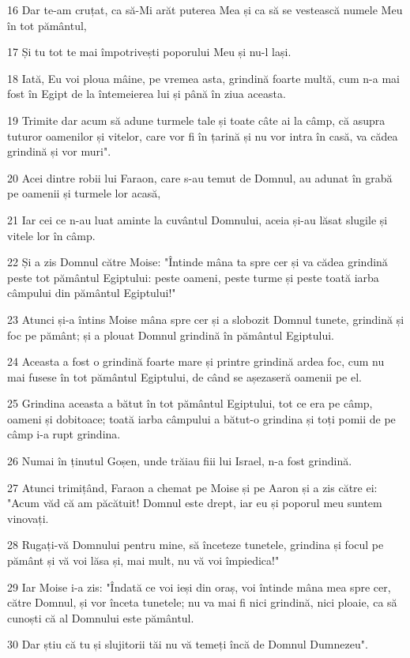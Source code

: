 \par 16 Dar te-am cruțat, ca să-Mi arăt puterea Mea și ca să se vestească numele Meu în tot pământul,
\par 17 Și tu tot te mai împotrivești poporului Meu și nu-l lași.
\par 18 Iată, Eu voi ploua mâine, pe vremea asta, grindină foarte multă, cum n-a mai fost în Egipt de la întemeierea lui și până în ziua aceasta.
\par 19 Trimite dar acum să adune turmele tale și toate câte ai la câmp, că asupra tuturor oamenilor și vitelor, care vor fi în țarină și nu vor intra în casă, va cădea grindină și vor muri".
\par 20 Acei dintre robii lui Faraon, care s-au temut de Domnul, au adunat în grabă pe oamenii și turmele lor acasă,
\par 21 Iar cei ce n-au luat aminte la cuvântul Domnului, aceia și-au lăsat slugile și vitele lor în câmp.
\par 22 Și a zis Domnul către Moise: "Întinde mâna ta spre cer și va cădea grindină peste tot pământul Egiptului: peste oameni, peste turme și peste toată iarba câmpului din pământul Egiptului!"
\par 23 Atunci și-a întins Moise mâna spre cer și a slobozit Domnul tunete, grindină și foc pe pământ; și a plouat Domnul grindină în pământul Egiptului.
\par 24 Aceasta a fost o grindină foarte mare și printre grindină ardea foc, cum nu mai fusese în tot pământul Egiptului, de când se așezaseră oamenii pe el.
\par 25 Grindina aceasta a bătut în tot pământul Egiptului, tot ce era pe câmp, oameni și dobitoace; toată iarba câmpului a bătut-o grindina și toți pomii de pe câmp i-a rupt grindina.
\par 26 Numai în ținutul Goșen, unde trăiau fiii lui Israel, n-a fost grindină.
\par 27 Atunci trimițând, Faraon a chemat pe Moise și pe Aaron și a zis către ei: "Acum văd că am păcătuit! Domnul este drept, iar eu și poporul meu suntem vinovați.
\par 28 Rugați-vă Domnului pentru mine, să înceteze tunetele, grindina și focul pe pământ și vă voi lăsa și, mai mult, nu vă voi împiedica!"
\par 29 Iar Moise i-a zis: "Îndată ce voi ieși din oraș, voi întinde mâna mea spre cer, către Domnul, și vor înceta tunetele; nu va mai fi nici grindină, nici ploaie, ca să cunoști că al Domnului este pământul.
\par 30 Dar știu că tu și slujitorii tăi nu vă temeți încă de Domnul Dumnezeu".
